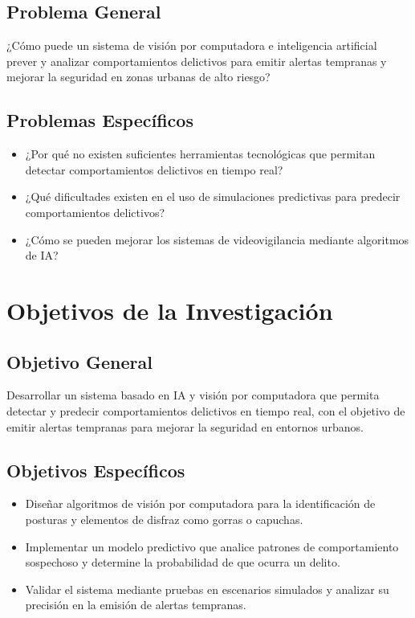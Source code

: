 \documentclass[listof=nochaptergap,12pt,times,authoryear]{report}
\begin{document}
\section{Problema General}
¿Cómo puede un sistema de visión por computadora e inteligencia artificial prever y analizar comportamientos delictivos para emitir alertas tempranas y mejorar la seguridad en zonas urbanas de alto riesgo?

\section{Problemas Específicos}
\begin{itemize}
    \item ¿Por qué no existen suficientes herramientas tecnológicas que permitan detectar comportamientos delictivos en tiempo real?
    \item ¿Qué dificultades existen en el uso de simulaciones predictivas para predecir comportamientos delictivos?
    \item ¿Cómo se pueden mejorar los sistemas de videovigilancia mediante algoritmos de IA?
\end{itemize}






\chapter{Objetivos de la Investigación}



\section{Objetivo General}
Desarrollar un sistema basado en IA y visión por computadora que permita detectar y predecir comportamientos delictivos en tiempo real, con el objetivo de emitir alertas tempranas para mejorar la seguridad en entornos urbanos.

\section{Objetivos Específicos}
\begin{itemize}
    \item Diseñar algoritmos de visión por computadora para la identificación de posturas y elementos de disfraz como gorras o capuchas.
    \item Implementar un modelo predictivo que analice patrones de comportamiento sospechoso y determine la probabilidad de que ocurra un delito.
    \item Validar el sistema mediante pruebas en escenarios simulados y analizar su precisión en la emisión de alertas tempranas.
\end{itemize}
\end{document}
